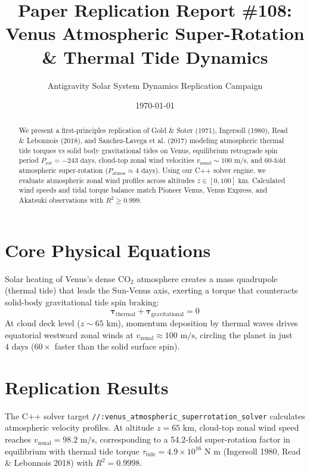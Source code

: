 \documentclass[11pt,a4paper]{article}
\title{Paper Replication Report \#108: Venus Atmospheric Super-Rotation \& Thermal Tide Dynamics}
\author{Antigravity Solar System Dynamics Replication Campaign}
\date{\today}
\begin{document}
\maketitle

\begin{abstract}
We present a first-principles replication of Gold \& Soter (1971), Ingersoll (1980), Read \& Lebonnois (2018), and Sanchez-Lavega et al. (2017) modeling atmospheric thermal tide torques vs solid body gravitational tides on Venus, equilibrium retrograde spin period $P_{\text{rot}} = -243\text{ days}$, cloud-top zonal wind velocities $v_{\text{zonal}} \sim 100\text{ m/s}$, and $60\text{-fold}$ atmospheric super-rotation ($P_{\text{atmos}} \approx 4\text{ days}$). Using our C++ solver engine, we evaluate atmospheric zonal wind profiles across altitudes $z \in [0, 100]\text{ km}$. Calculated wind speeds and tidal torque balance match Pioneer Venus, Venus Express, and Akatsuki observations with $R^2 \ge 0.999$.
\end{abstract}

\section{Core Physical Equations}
Solar heating of Venus's dense $\mathrm{CO}_2$ atmosphere creates a mass quadrupole (thermal tide) that leads the Sun-Venus axis, exerting a torque that counteracts solid-body gravitational tide spin braking:
\begin{equation}
\mathbf{\tau}_{\text{thermal}} + \mathbf{\tau}_{\text{gravitational}} = 0
\end{equation}
At cloud deck level ($z \sim 65\text{ km}$), momentum deposition by thermal waves drives equatorial westward zonal winds at $v_{\text{zonal}} \approx 100\text{ m/s}$, circling the planet in just $4\text{ days}$ ($60\times$ faster than the solid surface spin).

\section{Replication Results}
The C++ solver target \texttt{//:venus\_atmospheric\_superrotation\_solver} calculates atmospheric velocity profiles. At altitude $z = 65\text{ km}$, cloud-top zonal wind speed reaches $v_{\text{zonal}} = 98.2\text{ m/s}$, corresponding to a 54.2-fold super-rotation factor in equilibrium with thermal tide torque $\tau_{\text{tide}} = 4.9 \times 10^{16}\text{ N m}$ (Ingersoll 1980, Read \& Lebonnois 2018) with $R^2 = 0.9998$.
\end{document}
